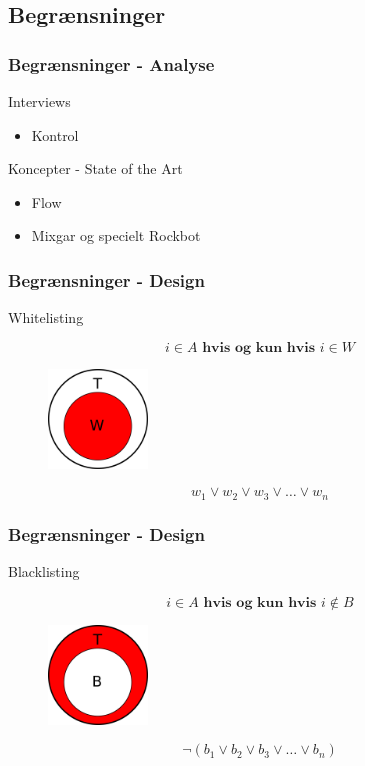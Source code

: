 \subsection{Begrænsninger}
\begin{frame}
	\frametitle{Begrænsninger - Analyse}
	Interviews
	\begin{itemize}
		\item Kontrol
	\end{itemize}
	Koncepter - State of the Art
	\begin{itemize}
		\item Flow
		\item Mixgar og specielt Rockbot
	\end{itemize}
\end{frame}

\begin{frame}
	\frametitle{Begrænsninger - Design}
	Whitelisting
	
	\begin{equation}
		i \in A \textbf{ hvis og kun hvis } i \in W
	\end{equation}
	
	\begin{figure}
    \centering
    \includegraphics[width=100px]{slides/Jens/whitelist}
  \end{figure}
	
	\begin{equation}
		w_1 \vee w_2 \vee w_3 \vee \dots \vee w_n
	\end{equation}
\end{frame}

\begin{frame}
	\frametitle{Begrænsninger - Design}
	Blacklisting
	
	\begin{equation}
		i \in A \textbf{ hvis og kun hvis } i \notin B
	\end{equation}
	
	\begin{figure}
    \centering
    \includegraphics[width=100px]{slides/Jens/blacklist}
  \end{figure}
	
	\begin{equation}
		\neg(b_1 \vee b_2 \vee b_3 \vee \dots \vee b_n)
	\end{equation}
\end{frame}


